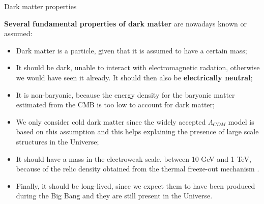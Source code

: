 \documentclass[8pt]{beamer}
\begin{document}
\begin{frame}{Dark matter properties}
\justifying

\textbf{Several fundamental properties of dark matter} are nowadays known or assumed:

\begin{itemize}
\justifying
\item Dark matter \alert{is a particle}, given that it is assumed to have a certain mass;
\item It should be \alert{dark}, unable to interact with electromagnetic radation, otherwise we would have seen it already. It should then also be \textbf{electrically neutral};
\item It is \alert{non-baryonic}, because the energy density for the baryonic matter estimated from the CMB is too low to account for dark matter;
\item We only consider \alert{cold dark matter} since the widely accepted $\Lambda_{CDM}$ model is based on this assumption and this helps explaining the presence of large scale structures in the Universe;
\item It should \alert{have a mass in the electroweak scale}, between 10 GeV and 1 TeV, because of the relic density obtained from the thermal freeze-out mechanism \cite{Freezeout1}.
\item Finally, it should be \alert{long-lived}, since we expect them to have been produced during the Big Bang and they are still present in the Universe.
\end{itemize}

\end{frame}
\end{document}
